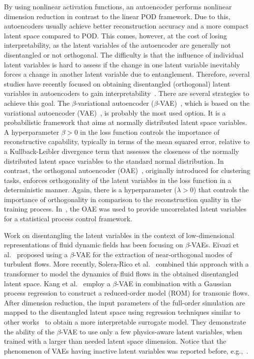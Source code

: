 By using nonlinear activation functions, an autoencoder performs nonlinear dimension reduction in contrast to the linear POD framework. Due to this, autoencoders usually achieve better reconstruction accuracy and a more compact latent space compared to POD. This comes, however, at the cost of losing interpretability, as the latent variables of the autoencoder are generally not disentangled or not orthogonal. 
The difficulty is that the influence of individual latent variables is hard to assess if the change in one latent variable inevitably forces a change in another latent variable due to entanglement.
%
Therefore, several studies have recently focused on obtaining disentangled (orthogonal) latent variables in autoencoders to gain interpretability~\cite{eivazi:2022, kang:2022, solera-rico:2024}. 
There are several strategies to achieve this goal.
The $\beta$-variational autoencoder ($\beta$-VAE)~\cite{Higgins2016betaVAELB}, which is based on the variational autoencoder (VAE)~\cite{Kingma:2013}, is probably the most used option. It is a probabilistic framework that aims at normally distributed latent space variables.  
A hyperparameter $\beta>0$ in the loss function controls the importance of reconstructive capability, typically in terms of the mean squared error, relative to a Kullback-Leibler divergence term that assesses the closeness of the normally distributed latent space variables to the standard normal distribution. 
%
In contrast, the orthogonal autoencoder (OAE)~\cite{wang:2019}, originally introduced for clustering tasks, enforces orthogonality of the latent variables in the loss function in a deterministic manner. 
Again, there is a hyperparameter ($\lambda>0$) that controls the importance of orthogonality in comparison to the reconstruction quality in the training process. 
In~\cite{CACCIARELLI2022107853}, the OAE was used to provide uncorrelated latent variables for a statistical process control framework. 

Work on disentangling the latent variables in the context of low-dimensional representations of fluid dynamic fields has been focusing on $\beta$-VAEs. 
Eivazi et al.~\cite{eivazi:2022} proposed using a $\beta$-VAE for the extraction of near-orthogonal modes of turbulent flows. More recently, Solera-Rico et al.~\cite{solera-rico:2024} combined this approach with a transformer to model the dynamics of fluid flows in the obtained disentangled latent space. 
Kang et al.~\cite{kang:2022} employ a $\beta$-VAE in combination with a Gaussian process regression to construct a reduced-order model (ROM) for transonic flows. After dimension reduction, the input parameters of the full-order simulation are mapped to the disentangled latent space using  regression techniques similar to other works~\cite{Swischuk.2019,Agostini20,Pache22,lazzara:2022, DIASRIBEIRO2023105949} to obtain a more interpretable surrogate model. They demonstrate the ability of the $\beta$-VAE to use only a few physics-aware latent variables, when trained with a larger than needed latent space dimension. Notice that the phenomenon of VAEs having inactive latent variables was reported before, e.g.,~\cite{bowman2016generating, burda2016importanceweightedautoencoders, ladder_vae}.


